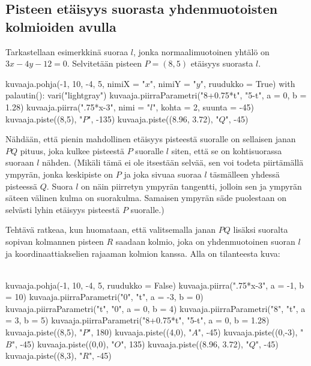 \subsection*{Pisteen etäisyys suorasta yhdenmuotoisten kolmioiden avulla}

Tarkastellaan esimerkkinä suoraa $l$, jonka normaalimuotoinen yhtälö on $3x-4y -12=0$.
Selvitetään pisteen $P=(8, 5)$ etäisyys suorasta $l$.

\begin{kuva}
    kuvaaja.pohja(-1, 10, -4, 5, nimiX = "$x$", nimiY = "$y$", ruudukko = True)
    with palautin():
        vari("lightgray")
        kuvaaja.piirraParametri("8+0.75*t", "5-t", a = 0, b = 1.28)
    kuvaaja.piirra(".75*x-3", nimi = "$l$", kohta = 2, suunta = -45)    
    kuvaaja.piste((8,5), "$P$", -135)
    kuvaaja.piste((8.96, 3.72), "$Q$", -45)
\end{kuva}


Nähdään, että pienin mahdollinen etäisyys pisteestä suoralle on sellaisen janan $PQ$ pituus, joka kulkee pisteestä $P$ suoralle $l$ siten, että se on kohtisuorassa suoraan $l$ nähden. (Mikäli tämä ei ole itsestään selvää, sen voi todeta piirtämällä ympyrän, jonka keskipiste on $P$ ja joka sivuaa suoraa $l$ täsmälleen yhdessä pisteessä $Q$. Suora $l$ on näin piirretyn ympyrän tangentti, jolloin sen ja ympyrän säteen välinen kulma on suorakulma. Samaisen ympyrän säde puolestaan on selvästi lyhin etäisyys pisteestä $P$ suoralle.)

Tehtävä ratkeaa, kun huomataan, että valitsemalla janan $PQ$ lisäksi suoralta sopivan kolmannen pisteen $R$ saadaan kolmio, joka on yhdenmuotoinen suoran $l$ ja koordinaattiakselien rajaaman kolmion kanssa. Alla on tilanteesta kuva:


\begin{kuva}\\
    kuvaaja.pohja(-1, 10, -4, 5, ruudukko = False)
    kuvaaja.piirra(".75*x-3", a = -1, b = 10)
    kuvaaja.piirraParametri("0", "t", a = -3, b = 0)
    kuvaaja.piirraParametri("t", "0", a = 0, b = 4)
    kuvaaja.piirraParametri("8", "t", a = 3, b = 5)
    kuvaaja.piirraParametri("8+0.75*t", "5-t", a = 0, b = 1.28)
    kuvaaja.piste((8,5), "$P$", 180)
    kuvaaja.piste((4,0), "$A$", -45)
    kuvaaja.piste((0,-3), "$B$", -45)
    kuvaaja.piste((0,0), "$O$", 135)
    kuvaaja.piste((8.96, 3.72), "$Q$", -45)
    kuvaaja.piste((8,3), "$R$", -45)
\end{kuva}

